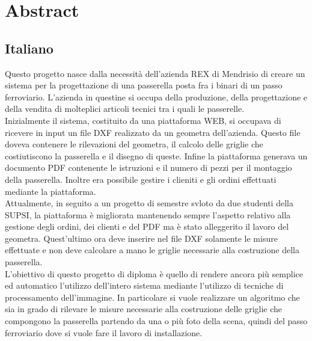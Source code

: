 \documentclass[twoside]{supsistudent}
\newcommand{\problemchapter}[1]{%
\chapter*{#1}%
\addcontentsline{toc}{chapter}{#1}%
\markboth{#1}{#1}
}
\begin{document}
\maketitle
\onehalfspacing
\frontmatter

\tableofcontents

\mainmatter %
\setcounter{page}{1}

\problemchapter{Abstract}
\section{Italiano}
Questo progetto nasce dalla necessità dell'azienda REX di Mendrisio di creare un sistema
per la progettazione di una passerella posta fra i binari di un passo ferroviario. L'azienda
in questine si occupa della produzione, della progettazione e della vendita di molteplici 
articoli tecnici tra i quali le passerelle. \\

Inizialmente il sistema, costituito da una piattaforma WEB, si occupava di ricevere in input un file DXF realizzato da un geometra 
dell'azienda. Questo file doveva contenere le rilevazioni del geometra, il calcolo delle griglie che costiutiscono la passerella e 
il disegno di queste. Infine la piattaforma generava un documento PDF contenente le istruzioni e il numero di pezzi per il montaggio della passerella.
Inoltre era possibile gestire i clieniti e gli ordini effettuati mediante la piattaforma. \\

Attualmente, in seguito a un progetto di semestre svloto da due studenti della SUPSI, la piattaforma è migliorata mantenendo sempre 
l'aspetto relativo alla gestione degli ordini, dei clienti e del PDF ma è stato alleggerito il lavoro del geometra. Quest'ultimo ora deve inserire 
nel file DXF solamente le misure effettuate e non deve calcolare a mano le griglie necessarie alla costruzione della passerella. \\

L'obiettivo di questo progetto di diploma è quello di rendere ancora più semplice ed automatico l'utilizzo dell'intero sistema mediante l'utilizzo 
di tecniche di processamento dell'immagine. In particolare si vuole realizzare un algoritmo che sia in grado di rilevare le misure necessarie alla costruzione
delle griglie che compongono la passerella partendo da una o più foto della scena, quindi del passo ferroviario dove si vuole fare il lavoro di installazione. \\
\pagebreak
\end{document}
